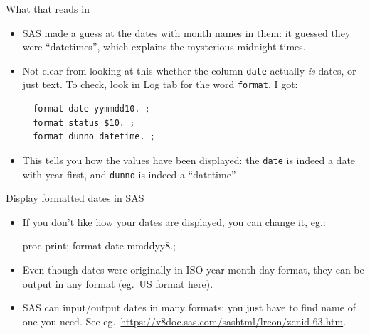 \documentclass[unknownkeysallowed]{beamer}\usepackage[]{graphicx}\usepackage[]{color}
\begin{document}
\begin{frame}[fragile]{What that reads in}
  
    
    
    \begin{itemize}
      
    \item SAS made a guess at the dates with month names in them: it
      guessed they were ``datetimes'', which explains the mysterious
      midnight times.
    \item Not clear from looking at this whether the column
      \texttt{date} actually \emph{is} dates, or just text. To check,
      look in Log tab for the word \texttt{format}. I got:
  
      \begin{small}
\begin{verbatim}
  format date yymmdd10. ;
  format status $10. ;
  format dunno datetime. ;
\end{verbatim}
        
      \end{small}
      
      
    \item This tells you how the values have been displayed: the
      \texttt{date} is indeed a date with year first, and
      \texttt{dunno} is indeed a ``datetime''.

\end{itemize}
  
\end{frame}

\begin{frame}[fragile]{Display formatted dates in SAS}

  \begin{itemize}
  \item If you don't like how your dates are displayed, you can change
    it, eg.:  
  
  \begin{Sascode}[store=db]
proc print;
  format date mmddyy8.;
  \end{Sascode}
  
  
  \item   Even though dates were originally in ISO year-month-day format, they
  can be output in any format (eg.\ US format here).
\item SAS can input/output dates in many formats; you just have to
  find name of one you need. See eg.\ \url{https://v8doc.sas.com/sashtml/lrcon/zenid-63.htm}.
  \end{itemize}
  
\end{frame}
\end{document}
